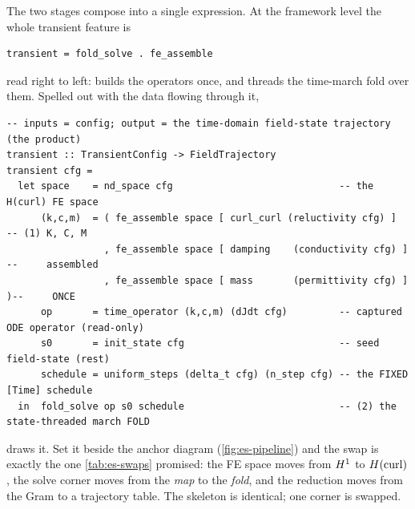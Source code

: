 The two stages compose into a single expression. At the framework level the whole
transient feature is
\begin{lstlisting}[style=l4style]
transient = fold_solve . fe_assemble
\end{lstlisting}
read right to left:  builds the operators once, and
 threads the time-march fold over them. Spelled out with the data
flowing through it,
\begin{lstlisting}[style=l4style]
-- inputs = config; output = the time-domain field-state trajectory (the product)
transient :: TransientConfig -> FieldTrajectory
transient cfg =
  let space    = nd_space cfg                             -- the H(curl) FE space
      (k,c,m)  = ( fe_assemble space [ curl_curl (reluctivity cfg) ]   -- (1) K, C, M
                 , fe_assemble space [ damping    (conductivity cfg) ]  --     assembled
                 , fe_assemble space [ mass       (permittivity cfg) ] )--     ONCE
      op       = time_operator (k,c,m) (dJdt cfg)         -- captured ODE operator (read-only)
      s0       = init_state cfg                           -- seed field-state (rest)
      schedule = uniform_steps (delta_t cfg) (n_step cfg) -- the FIXED [Time] schedule
  in  fold_solve op s0 schedule                           -- (2) the state-threaded march FOLD
\end{lstlisting}
 draws it. Set it beside the anchor diagram
(\cref{fig:es-pipeline}) and the swap is exactly the one \cref{tab:es-swaps}
promised: the FE space moves from $H^1$ to $H(\mathrm{curl})$, the solve corner moves from
the  \emph{map} to the  \emph{fold}, and the
reduction moves from the Gram to a trajectory table. The skeleton is identical; one
corner is swapped.

